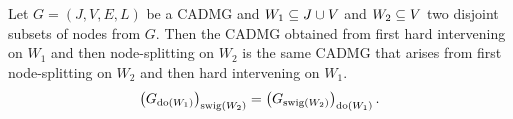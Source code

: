 \documentclass[main]{subfiles}
\begin{document}
\def\rowref{claim\_3\_11}
\label{claim_3_11}
%

\begin{Lem}
   Let $G=(J,V,E,L)$ be a CADMG and $W_1 \subseteq J \cup V$ and $W_2 \subseteq V$ two disjoint subsets of nodes from $G$.
   Then the CADMG obtained from first hard intervening on $W_1$ and then node-splitting on $W_2$ is the same CADMG that arises from first node-splitting on $W_2$ and then hard intervening on $W_1$.
      \[ \left ( G_{\operatorname{do}(W_1)} \right )_{\mathrm{swig}(W_2)} =  \left ( G_{\mathrm{swig}(W_2)} \right )_{\operatorname{do}(W_1)}.   \]
\end{Lem}
\end{document}
